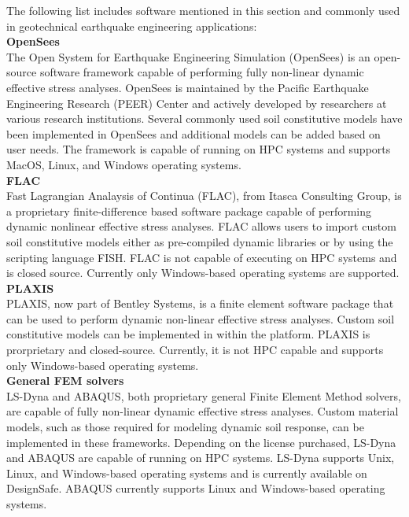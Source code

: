 The following list includes software mentioned in this section and commonly used in geotechnical earthquake engineering applications:\\

\noindent\textbf{OpenSees}\\
The Open System for Earthquake Engineering Simulation (OpenSees) is an open-source software framework capable of performing fully non-linear dynamic effective stress analyses. OpenSees is maintained by the Pacific Earthquake Engineering Research (PEER) Center and actively developed by researchers at various research institutions. Several commonly used soil constitutive models have been implemented in OpenSees and additional models can be added based on user needs. The framework is capable of running on HPC systems and supports MacOS, Linux, and Windows operating systems.\\

\noindent\textbf{FLAC}\\
Fast Lagrangian Analaysis of Continua (FLAC), from Itasca Consulting Group, is a proprietary finite-difference based software package capable of performing dynamic nonlinear effective stress analyses. FLAC allows users to import custom soil constitutive models either as pre-compiled dynamic libraries or by using the scripting language FISH. FLAC is not capable of executing on HPC systems and is closed source. Currently only Windows-based operating systems are supported.\\

\noindent\textbf{PLAXIS}\\
PLAXIS, now part of Bentley Systems, is a finite element software package that can be used to perform dynamic non-linear effective stress analyses. Custom soil constitutive models can be implemented in within the platform. PLAXIS is prorprietary and closed-source. Currently, it is not HPC capable and supports only Windows-based operating systems.\\

\noindent\textbf{General FEM solvers}\\
LS-Dyna and ABAQUS, both proprietary general Finite Element Method solvers, are capable of fully non-linear dynamic effective stress analyses. Custom material models, such as those required for modeling dynamic soil response, can be implemented in these frameworks. Depending on the license purchased, LS-Dyna and ABAQUS are capable of running on HPC systems. LS-Dyna supports Unix, Linux, and Windows-based operating systems and is currently available on DesignSafe. ABAQUS currently supports Linux and Windows-based operating systems.\\
